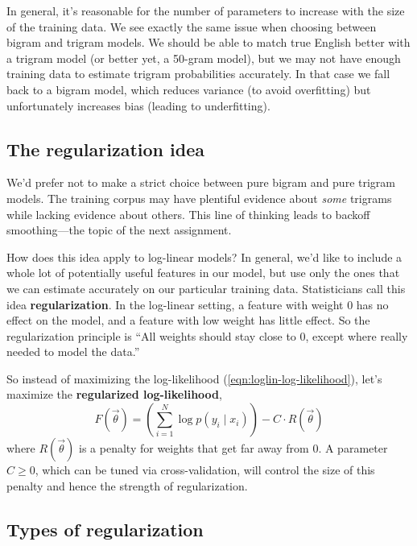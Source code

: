 \documentclass[11pt]{article}
\newcommand{\vtheta}{\vec{\theta}}
\begin{document}
In general, it's reasonable for the number of parameters to increase
with the size of the training data.  We see exactly the same issue
when choosing between bigram and trigram models.  We should be able to
match true English better with a trigram model (or better yet, a
50-gram model), but we may not have enough training data to estimate
trigram probabilities accurately.  In that case we fall back to a
bigram model, which reduces variance (to avoid overfitting) but
unfortunately increases bias (leading to underfitting).

\subsection{The regularization idea}

We'd prefer not to make a strict choice between pure bigram and
pure trigram models.  The training corpus may have plentiful evidence
about {\em some} trigrams while lacking evidence about others.  This
line of thinking leads to backoff smoothing---the topic of the next
assignment.

How does this idea apply to log-linear models?  In general, we'd like
to include a whole lot of potentially useful features in our model,
but use only the ones that we can estimate accurately on our
particular training data.  Statisticians call this idea {\bf
  regularization}.  In the log-linear setting, a feature with weight 0
has no effect on the model, and a feature with low weight has little
effect.  So the regularization principle is ``All weights should stay
close to 0, except where really needed to model the data.''

So instead of maximizing the log-likelihood
(\ref{eqn:loglin-log-likelihood}), let's maximize the
{\bf regularized log-likelihood},
\begin{equation}\label{eqn:loglin-regularized}
  F(\vtheta) = \left( \sum_{i=1}^N \log p(y_i \mid x_i) \right) - C\cdot R(\vtheta)
\end{equation}
where $R(\vtheta)$ is a penalty for weights that get far away from 0.
A parameter $C \geq 0$, which can be tuned via cross-validation, will control the size of this penalty and
hence the strength of regularization.

\subsection{Types of regularization}
\end{document}
